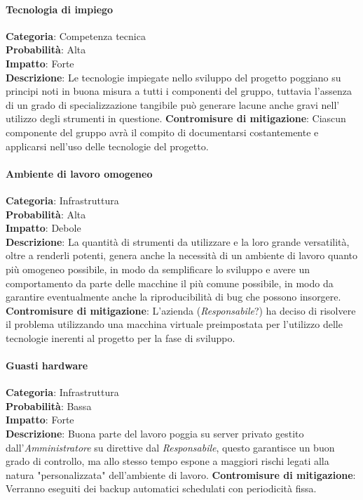 \documentclass{scalatekids-article}
\begin{document}
\paragraph{Tecnologia di impiego}
\textbf{Categoria}: Competenza tecnica\\
\textbf{Probabilità}: Alta\\
\textbf{Impatto}: Forte\\
\textbf{Descrizione}: Le tecnologie impiegate nello sviluppo del progetto poggiano su principi noti in buona misura a tutti
i componenti del gruppo, tuttavia l'assenza di un grado di specializzazione tangibile può generare lacune anche gravi nell' utilizzo
degli strumenti in questione.
\textbf{Contromisure di mitigazione}: Ciascun componente del gruppo avrà il compito di documentarsi costantemente e applicarsi
nell'uso delle tecnologie del progetto.
\paragraph{Ambiente di lavoro omogeneo}
\textbf{Categoria}: Infrastruttura\\
\textbf{Probabilità}: Alta\\
\textbf{Impatto}: Debole\\
\textbf{Descrizione}: La quantità di strumenti da utilizzare e la loro grande versatilità, oltre a renderli potenti, genera anche
la necessità di un ambiente di lavoro quanto più omogeneo possibile, in modo da semplificare lo sviluppo e avere un comportamento
da parte delle macchine il più comune possibile, in modo da garantire eventualmente anche la riproducibilità di bug che possono
insorgere.
\textbf{Contromisure di mitigazione}: L'azienda (\textit{Responsabile}?) ha deciso di risolvere il problema utilizzando una macchina virtuale
preimpostata per l'utilizzo delle tecnologie inerenti al progetto per la fase di sviluppo.
\paragraph{Guasti hardware}
\textbf{Categoria}: Infrastruttura\\
\textbf{Probabilità}: Bassa\\
\textbf{Impatto}: Forte\\
\textbf{Descrizione}: Buona parte del lavoro poggia su server privato gestito dall'\textit{Amministratore} su direttive dal \textit{Responsabile},
questo garantisce un buon grado di controllo, ma allo stesso tempo espone a maggiori rischi legati alla natura "personalizzata" dell'ambiente di lavoro.
\textbf{Contromisure di mitigazione}: Verranno eseguiti dei backup automatici schedulati con periodicità fissa.
\paragraph{}
\end{document}
